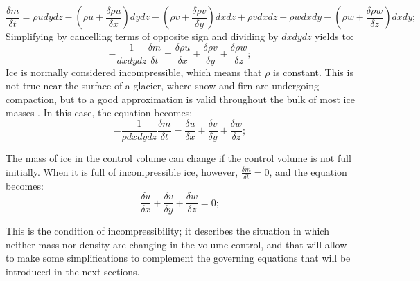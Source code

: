 \documentclass{article}
\begin{document}
\begin{equation}
	\frac{\delta m}{\delta t}=\rho u dydz-({\rho u+\frac{\delta \rho u}{\delta x}})dydz-({\rho v+\frac{\delta \rho v}{\delta y}})dxdz+\rho vdxdz+\rho wdxdy-({\rho w+\frac{\delta \rho w}{\delta z}})dxdy;
\end{equation}
Simplifying by cancelling terms of opposite sign and dividing by $dxdydz$ yields to:
\begin{equation}
	-\frac{1}{dxdydz}\frac{\delta m}{\delta t}=\frac{\delta \rho u}{\delta x}+\frac{\delta \rho v}{\delta y}+\frac{\delta \rho w}{\delta z};
\end{equation}
Ice is normally considered incompressible, which means that $\rho$ is constant. This is not true near the surface of a glacier, where snow and firn are undergoing compaction, but to a good approximation is valid throughout the bulk of most ice masses \cite[]{hooke2019principles}. In this case, the equation becomes:
\begin{equation}
	-\frac{1}{\rho dxdydz}\frac{\delta m}{\delta t}=\frac{\delta u}{\delta x}+\frac{\delta v}{\delta y}+\frac{\delta w}{\delta z};
\end{equation}

The mass of ice in the control volume can change if the control volume is not full initially. When it is full of incompressible ice, however, $\frac{\delta m}{\delta t}=0$, and the equation becomes:
\begin{equation}
	\frac{\delta u}{\delta x}+\frac{\delta v}{\delta y}+\frac{\delta w}{\delta z}=0;
\end{equation}

This is the condition of incompressibility; it describes the situation in which neither mass nor density are changing in the volume control, and that will allow to make some simplifications to complement the governing equations that will be introduced in the next sections. 
\end{document}
